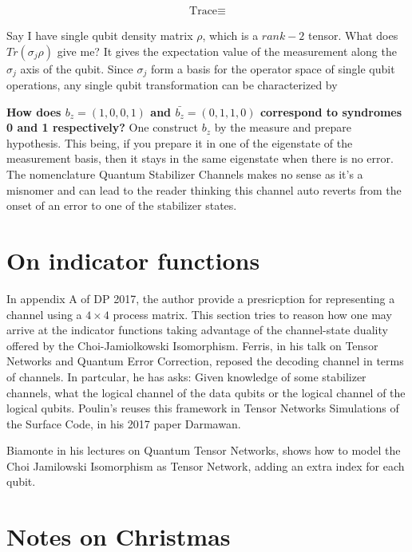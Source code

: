 \documentclass[%
 reprint,
amsmath,amssymb,
aps,
onecolumn,
]{revtex4-2}
\begin{document}
\begin{align*}
    \text{Trace} \equiv 
\end{align*}

Say I have single qubit density matrix $\rho$, which is a $rank-2$ tensor. What does $Tr(\sigma_j \rho)$ give me? It gives the expectation value of the measurement along the $\sigma_j$ axis of the qubit. Since ${\sigma_j}$ form a basis for the operator space of single qubit operations, any single qubit transformation can be characterized by 


\textbf{How does $b_z =(1,0,0,1)$ and $\bar{b_z} = (0,1,1,0)$ correspond to syndromes 0 and 1 respectively?}
One construct $b_z$ by the measure and prepare hypothesis. This being, if you prepare it in one of the eigenstate of the measurement basis, then it stays in the same eigenstate when there is no error. The nomenclature Quantum Stabilizer Channels makes no sense as it's a misnomer and can lead to the reader thinking this channel auto reverts from the onset of an error to one of the stabilizer states. 



\section{On indicator functions}
In appendix A of DP 2017, the author provide a presricption for representing a channel using a $4 \times 4$ process matrix. This section tries to reason how one may arrive at the indicator functions taking advantage of the channel-state duality offered by the Choi-Jamiolkowski Isomorphism. Ferris, in his talk on Tensor Networks and Quantum Error Correction, reposed the decoding channel in terms of channels. In partcular, he has asks: Given knowledge of some stabilizer channels, what the logical channel of the data qubits or the logical channel of the logical qubits. Poulin's reuses this framework in Tensor Networks Simulations of the Surface Code, in his 2017 paper Darmawan. 


Biamonte in his lectures on Quantum Tensor Networks, shows how to model the Choi Jamilowski Isomorphism as Tensor Network, adding an extra index for each qubit. 


\section{Notes on Christmas}
\end{document}
